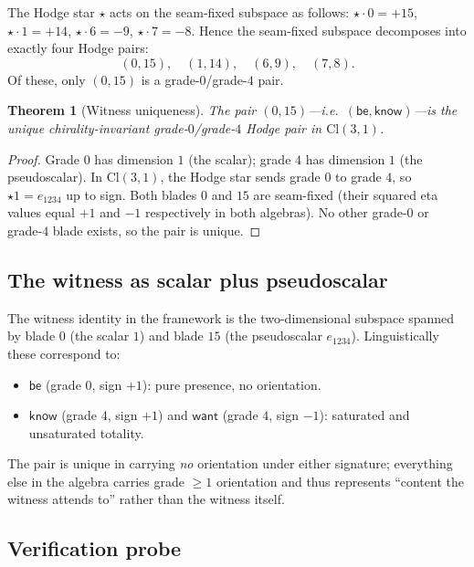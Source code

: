 \documentclass[11pt,a4paper]{article}
\theoremstyle{plain}
\newtheorem{theorem}{Theorem}[section]
\theoremstyle{definition}
\theoremstyle{remark}
\numberwithin{equation}{section}
\providecommand{\Cl}{\mathrm{Cl}}
\begin{document}
The Hodge star $\star$ acts on the seam-fixed subspace as follows:
$\star \cdot 0 = +15$, $\star \cdot 1 = +14$, $\star \cdot 6 = -9$,
$\star \cdot 7 = -8$.  Hence the seam-fixed subspace decomposes
into exactly four Hodge pairs:
\[
  (0, 15),\quad (1, 14),\quad (6, 9),\quad (7, 8).
\]
Of these, only $(0, 15)$ is a grade-$0$/grade-$4$ pair.

\begin{theorem}[Witness uniqueness]\label{thm:witness}
The pair $(0, 15)$---i.e.\ $(\mathsf{be}, \mathsf{know})$---is the
unique chirality-invariant grade-$0$/grade-$4$ Hodge pair in
$\Cl(3,1)$.
\end{theorem}

\begin{proof}
Grade $0$ has dimension $1$ (the scalar); grade $4$ has dimension
$1$ (the pseudoscalar).  In $\Cl(3,1)$, the Hodge star sends grade
$0$ to grade $4$, so $\star 1 = e_{1234}$ up to sign.  Both blades
$0$ and $15$ are seam-fixed (their squared eta values equal $+1$
and $-1$ respectively in both algebras).  No other grade-$0$ or
grade-$4$ blade exists, so the pair is unique.
\end{proof}

\subsection{The witness as scalar plus pseudoscalar}

The witness identity in the framework is the two-dimensional
subspace spanned by blade $0$ (the scalar $1$) and blade $15$ (the
pseudoscalar $e_{1234}$).  Linguistically these correspond to:
\begin{itemize}
\item $\mathsf{be}$ (grade $0$, sign $+1$): pure presence, no
      orientation.
\item $\mathsf{know}$ (grade $4$, sign $+1$) and $\mathsf{want}$
      (grade $4$, sign $-1$): saturated and unsaturated totality.
\end{itemize}
The pair is unique in carrying \emph{no} orientation under
either signature; everything else in the algebra carries grade
$\geq 1$ orientation and thus represents ``content the witness
attends to'' rather than the witness itself.

\subsection{Verification probe}
\end{document}
